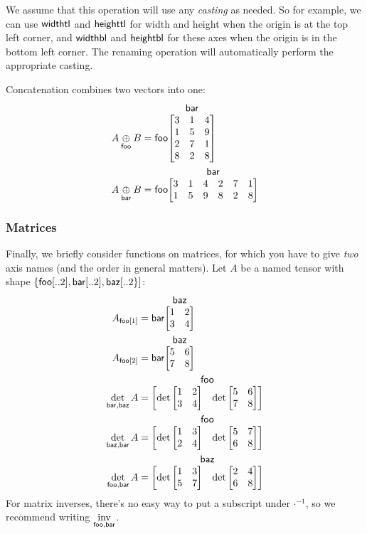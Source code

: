 \documentclass{article}
\makeatletter
\newcommand{\nmatrix}[3]{\name{#1}\begin{array}[b]{@{}c@{}}\name{#2}\\\begin{bmatrix}#3\end{bmatrix}\end{array}}
\makeatother
\begin{document}
We assume that this operation will use any \emph{casting} as needed. 
So for example, we can use  $\name{widthtl}$ and $\name{heighttl}$  for width and height when the origin is at the top left corner, and 
$\name{widthbl}$ and $\name{heightbl}$ for these axes when the origin is in the bottom left corner. 
The renaming operation will automatically perform the appropriate casting. 



Concatenation combines two vectors into one:
\begin{align*}
  A \ncat{foo} B &= \nmatrix{foo}{bar}{
    3 & 1 & 4 \\
    1 & 5 & 9 \\
    2 & 7 & 1 \\
    8 & 2 & 8
  } \\
  A \ncat{bar} B &= \nmatrix{foo}{bar}{
    3 & 1 & 4 & 2 & 7 & 1 \\
    1 & 5 & 9 & 8 & 2 & 8
  }
\end{align*}


\subsubsection{Matrices}

Finally, we briefly consider functions on matrices, for which you have to give \emph{two} axis names (and the order in general matters). Let $A$ be a named tensor with shape $\{\nset{foo}{..2},\nset{bar}{..2},\nset{baz}{..2\}}$:
\begin{align*}
A_{\nidx{foo}{1}} &= \nmatrix{bar}{baz}{
  1 & 2 \\
  3 & 4
} \\
A_{\nidx{foo}{2}} &= \nmatrix{bar}{baz}{
  5 & 6 \\
  7 & 8
} \\
\nfun{bar,baz}{det} A &= \nmatrix{}{foo}{\det \begin{bmatrix} 1 & 2 \\ 3 & 4 \end{bmatrix} & \det \begin{bmatrix} 5 & 6 \\ 7 & 8 \end{bmatrix}} \\
\nfun{baz,bar}{det} A &= \nmatrix{}{foo}{\det \begin{bmatrix} 1 & 3 \\ 2 & 4 \end{bmatrix} & \det \begin{bmatrix} 5 & 7 \\ 6 & 8 \end{bmatrix}} \\
\nfun{foo,bar}{det} A &= \nmatrix{}{baz}{\det \begin{bmatrix} 1 & 3 \\ 5 & 7 \end{bmatrix} & \det \begin{bmatrix} 2 & 4 \\ 6 & 8 \end{bmatrix}}
\end{align*}
For matrix inverses, there's no easy way to put a subscript under $\mathord\cdot^{-1}$, so we recommend writing $\nfun{foo,bar}{inv}$.
\end{document}
